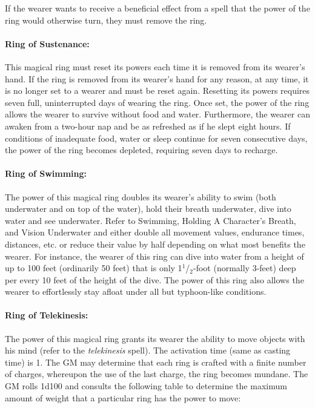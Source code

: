 \begin{multicols}{2}
If the wearer wants to receive a beneficial effect from a spell that the power of the ring would otherwise turn, they must remove the ring.

\paragraph{Ring of Sustenance:} This magical ring must reset its powers each time it is removed from its wearer's hand.  If the ring is removed from its wearer's hand for any reason, at any time, it is no longer set to a wearer and must be reset again.  Resetting its powers requires seven full, uninterrupted days of wearing the ring.  Once set, the power of the ring allows the wearer to survive without food and water.  Furthermore, the wearer can awaken from a two-hour nap and be as refreshed as if he slept eight hours.  If conditions of inadequate food, water or sleep continue for seven consecutive days, the power of the ring becomes depleted, requiring seven days to recharge.

\paragraph{Ring of Swimming:} The power of this magical ring doubles its wearer's ability to swim (both underwater and on top of the water), hold their breath underwater, dive into water and see underwater.  Refer to Swimming, Holding A Character's Breath, and Vision Underwater and either double all movement values, endurance times, distances, etc. or reduce their value by half depending on what most benefits the wearer.  For instance, the wearer of this ring can dive into water from a height of up to 100 feet (ordinarily 50 feet) that is only 1$^1$/$_2$-foot (normally 3-feet) deep per every 10 feet of the height of the dive.  The power of this ring also allows the wearer to effortlessly stay afloat under all but typhoon-like conditions.

\paragraph{Ring of Telekinesis:} The power of this magical ring grants its wearer the ability to move objects with his mind (refer to the \textit{telekinesis} spell).  The activation time (same as casting time) is 1.  The GM may determine that each ring is crafted with a finite number of charges, whereupon the use of the last charge, the ring becomes mundane.  The GM rolls 1d100 and consults the following table to determine the maximum amount of weight that a particular ring has the power to move:


\end{multicols}
